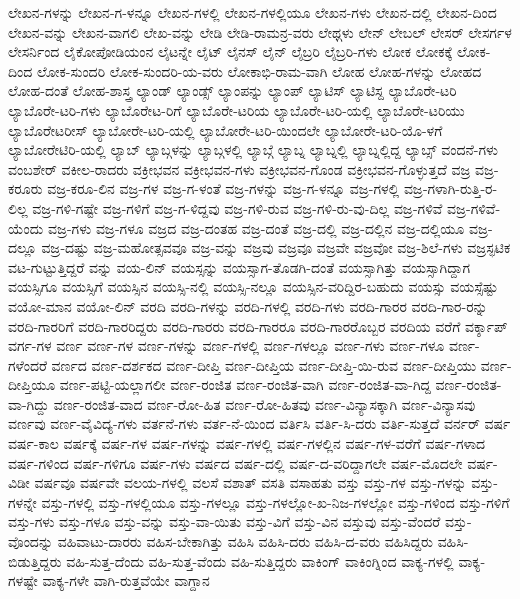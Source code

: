 {ಲೇಖನ-ಗಳನ್ನು
ಲೇಖನ-ಗ-ಳನ್ನೂ
ಲೇಖನ-ಗಳಲ್ಲಿ
ಲೇಖನ-ಗಳಲ್ಲಿಯೂ
ಲೇಖನ-ಗಳು
ಲೇಖನ-ದಲ್ಲಿ
ಲೇಖನ-ದಿಂದ
ಲೇಖನ-ವನ್ನು
ಲೇಖನ-ವಾಗಲಿ
ಲೇಖ-ವನ್ನು
ಲೇಡಿ
ಲೇಡಿ-ರಾಮನ್ರ-ವರು
ಲೇಥ್ಗಳು
ಲೇನ್
ಲೇಬಲ್
ಲೇಸರ್
ಲೇಸರ್ಗಳ
ಲೇಸರ್ನಿಂದ
ಲೈಕೋಪೋಡಿಯಂನ
ಲೈಟನ್ನೇ
ಲೈಟ್
ಲೈನಸ್
ಲೈನ್
ಲೈಬ್ರರಿ
ಲೈಬ್ರರಿ-ಗಳು
ಲೋಕ
ಲೋಕಕ್ಕೆ
ಲೋಕ-ದಿಂದ
ಲೋಕ-ಸುಂದರಿ
ಲೋಕ-ಸುಂದರಿ-ಯ-ವರು
ಲೋಕಾಭಿ-ರಾಮ-ವಾಗಿ
ಲೋಹ
ಲೋಹ-ಗಳನ್ನು
ಲೋಹದ
ಲೋಹ-ದಂತೆ
ಲೋಹ-ಶಾಸ್ತ್ರ
ಲ್ಯಾಂಡ್
ಲ್ಯಾಂಡ್ಸ್
ಲ್ಯಾಂಪನ್ನು
ಲ್ಯಾಂಪ್
ಲ್ಯಾಟಿಸ್
ಲ್ಯಾಟಿಸ್ದ
ಲ್ಯಾಬೊರೇ-ಟರಿ
ಲ್ಯಾಬೊರೇ-ಟರಿ-ಗಳು
ಲ್ಯಾಬೊರೇಟ-ರಿಗೆ
ಲ್ಯಾಬೊರೇ-ಟರಿಯ
ಲ್ಯಾಬೊರೇ-ಟರಿ-ಯಲ್ಲಿ
ಲ್ಯಾಬೊರೇ-ಟರಿಯು
ಲ್ಯಾಬೊರೇಟರೀಸ್
ಲ್ಯಾಬೋರೇ-ಟರಿ-ಯಲ್ಲಿ
ಲ್ಯಾಬೋರೇ-ಟರಿ-ಯಿಂದಲೇ
ಲ್ಯಾಬೋರೇ-ಟರಿ-ಯೊ-ಳಗೆ
ಲ್ಯಾಬೋರೇಟಿರಿ-ಯಲ್ಲಿ
ಲ್ಯಾಬ್
ಲ್ಯಾಬ್ಗಳನ್ನು
ಲ್ಯಾಬ್ಗಳಲ್ಲಿ
ಲ್ಯಾಬ್ಗೆ
ಲ್ಯಾಬ್ನ
ಲ್ಯಾಬ್ನಲ್ಲಿ
ಲ್ಯಾಬ್ನಲ್ಲಿದ್ದ
ಲ್ಯಾಬ್ಸ್
ವಂದನೆ-ಗಳು
ವಂಬಶೇರ್
ವಕೀಲ-ರಾದರು
ವಕ್ರೀಭವನ
ವಕ್ರೀಭವನ-ಗಳು
ವಕ್ರೀಭವನ-ಗೊಂಡ
ವಕ್ರೀಭವನ-ಗೊಳ್ಳುತ್ತದೆ
ವಜ್ರ
ವಜ್ರ-ಕರೂರು
ವಜ್ರ-ಕರೂ-ಲಿನ
ವಜ್ರ-ಗಳ
ವಜ್ರ-ಗ-ಳಂತೆ
ವಜ್ರ-ಗಳನ್ನು
ವಜ್ರ-ಗ-ಳನ್ನೂ
ವಜ್ರ-ಗಳಲ್ಲಿ
ವಜ್ರ-ಗಳಾಗಿ-ರುತ್ತಿ-ರ-ಲಿಲ್ಲ
ವಜ್ರ-ಗಳಿ-ಗಷ್ಟೇ
ವಜ್ರ-ಗಳಿಗೆ
ವಜ್ರ-ಗ-ಳಿದ್ದವು
ವಜ್ರ-ಗಳಿ-ರುವ
ವಜ್ರ-ಗಳಿ-ರು-ವು-ದಿಲ್ಲ
ವಜ್ರ-ಗಳಿವೆ
ವಜ್ರ-ಗಳಿವೆ-ಯೆಂದು
ವಜ್ರ-ಗಳು
ವಜ್ರ-ಗಳೂ
ವಜ್ರದ
ವಜ್ರ-ದಂತಹ
ವಜ್ರ-ದಂತೆ
ವಜ್ರ-ದಲ್ಲಿ
ವಜ್ರ-ದಲ್ಲಿನ
ವಜ್ರ-ದಲ್ಲಿಯೂ
ವಜ್ರ-ದಲ್ಲೂ
ವಜ್ರ-ದಷ್ಟು
ವಜ್ರ-ಮಹೋತ್ಸವವೂ
ವಜ್ರ-ವನ್ನು
ವಜ್ರವು
ವಜ್ರವೂ
ವಜ್ರವೇ
ವಜ್ರವೋ
ವಜ್ರ-ಶಿಲೆ-ಗಳು
ವಜ್ರಸ್ಫಟಿಕ
ವಟ-ಗುಟ್ಟುತ್ತಿದ್ದರೆ
ವನ್ನು
ವಯ-ಲಿನ್
ವಯಸ್ಸನ್ನು
ವಯಸ್ಸಾಗ-ತೊಡಗಿ-ದಂತೆ
ವಯಸ್ಸಾಗಿತ್ತು
ವಯಸ್ಸಾಗಿದ್ದಾಗ
ವಯಸ್ಸಿಗೂ
ವಯಸ್ಸಿಗೆ
ವಯಸ್ಸಿನ
ವಯಸ್ಸಿ-ನಲ್ಲಿ
ವಯಸ್ಸಿ-ನಲ್ಲೂ
ವಯಸ್ಸಿನ-ವರಿದ್ದಿರ-ಬಹುದು
ವಯಸ್ಸು
ವಯಸ್ಸೆಷ್ಟು
ವಯೋ-ಮಾನ
ವಯೋ-ಲಿನ್
ವರದಿ
ವರದಿ-ಗಳನ್ನು
ವರದಿ-ಗಳಲ್ಲಿ
ವರದಿ-ಗಳು
ವರದಿ-ಗಾರರ
ವರದಿ-ಗಾರ-ರನ್ನು
ವರದಿ-ಗಾರರಿಗೆ
ವರದಿ-ಗಾರರಿದ್ದರು
ವರದಿ-ಗಾರರು
ವರದಿ-ಗಾರರೂ
ವರದಿ-ಗಾರರೊಬ್ಬರ
ವರದಿಯ
ವರೆಗೆ
ವರ್ಕ್ಶಾಪ್
ವರ್ಗ-ಗಳ
ವರ್ಣ
ವರ್ಣ-ಗಳ
ವರ್ಣ-ಗಳನ್ನು
ವರ್ಣ-ಗಳಲ್ಲಿ
ವರ್ಣ-ಗಳಲ್ಲೂ
ವರ್ಣ-ಗಳು
ವರ್ಣ-ಗಳೂ
ವರ್ಣ-ಗಳೆಂದರೆ
ವರ್ಣದ
ವರ್ಣ-ದರ್ಶಕದ
ವರ್ಣ-ದೀಪ್ತಿ
ವರ್ಣ-ದೀಪ್ತಿಯ
ವರ್ಣ-ದೀಪ್ತಿ-ಯಿ-ರುವ
ವರ್ಣ-ದೀಪ್ತಿಯು
ವರ್ಣ-ದೀಪ್ತಿಯೂ
ವರ್ಣ-ಪಟ್ಟಿ-ಯಲ್ಲಾಗಲೀ
ವರ್ಣ-ರಂಜಿತ
ವರ್ಣ-ರಂಜಿತ-ವಾಗಿ
ವರ್ಣ-ರಂಜಿತ-ವಾ-ಗಿದ್ದ
ವರ್ಣ-ರಂಜಿತ-ವಾ-ಗಿದ್ದು
ವರ್ಣ-ರಂಜಿತ-ವಾದ
ವರ್ಣ-ರೋ-ಹಿತ
ವರ್ಣ-ರೋ-ಹಿತವು
ವರ್ಣ-ವಿನ್ಯಾಸಕ್ಕಾಗಿ
ವರ್ಣ-ವಿನ್ಯಾಸವು
ವರ್ಣವು
ವರ್ಣ-ವೈವಿದ್ಯ-ಗಳು
ವರ್ತನೆ-ಗಳು
ವರ್ತ-ನೆ-ಯಿಂದ
ವರ್ತಿಸಿ
ವರ್ತಿ-ಸಿ-ದರು
ವರ್ತಿ-ಸುತ್ತದೆ
ವರ್ನರ್
ವರ್ಷ
ವರ್ಷ-ಕಾಲ
ವರ್ಷಕ್ಕೆ
ವರ್ಷ-ಗಳ
ವರ್ಷ-ಗಳನ್ನು
ವರ್ಷ-ಗಳಲ್ಲಿ
ವರ್ಷ-ಗಳಲ್ಲಿನ
ವರ್ಷ-ಗಳ-ವರೆಗೆ
ವರ್ಷ-ಗಳಾದ
ವರ್ಷ-ಗಳಿಂದ
ವರ್ಷ-ಗಳಿಗೂ
ವರ್ಷ-ಗಳು
ವರ್ಷದ
ವರ್ಷ-ದಲ್ಲಿ
ವರ್ಷ-ದ-ವರಿದ್ದಾಗಲೇ
ವರ್ಷ-ಮೊದಲೇ
ವರ್ಷ-ವಿಡೀ
ವರ್ಷವೂ
ವರ್ಷವೇ
ವಲಯ-ಗಳಲ್ಲಿ
ವಲಸೆ
ವಶಾತ್
ವಸತಿ
ವಸಾಹತು
ವಸ್ತು
ವಸ್ತು-ಗಳ
ವಸ್ತು-ಗಳನ್ನು
ವಸ್ತು-ಗಳನ್ನೇ
ವಸ್ತು-ಗಳಲ್ಲಿ
ವಸ್ತು-ಗಳಲ್ಲಿಯೂ
ವಸ್ತು-ಗಳಲ್ಲೂ
ವಸ್ತು-ಗಳಲ್ಲೋ-ಖ-ನಿಜ-ಗಳಲ್ಲೋ
ವಸ್ತು-ಗಳಿಂದ
ವಸ್ತು-ಗಳಿಗೆ
ವಸ್ತು-ಗಳು
ವಸ್ತು-ಗಳೂ
ವಸ್ತು-ವನ್ನು
ವಸ್ತು-ವಾ-ಯಿತು
ವಸ್ತು-ವಿಗೆ
ವಸ್ತು-ವಿನ
ವಸ್ತುವು
ವಸ್ತು-ವೆಂದರೆ
ವಸ್ತು-ವೊಂದನ್ನು
ವಹಿವಾಟು-ದಾರರು
ವಹಿಸ-ಬೇಕಾಗಿತ್ತು
ವಹಿಸಿ
ವಹಿಸಿ-ದರು
ವಹಿಸಿ-ದ-ವರು
ವಹಿಸಿದ್ದರು
ವಹಿಸಿ-ಬಿಡುತ್ತಿದ್ದರು
ವಹಿ-ಸುತ್ತ-ದೆಂದು
ವಹಿ-ಸುತ್ತ-ವೆಂದು
ವಹಿ-ಸುತ್ತಿದ್ದರು
ವಾಕಿಂಗ್
ವಾಕಿಂಗ್ನಿಂದ
ವಾಕ್ಯ-ಗಳಲ್ಲಿ
ವಾಕ್ಯ-ಗಳಷ್ಟೇ
ವಾಕ್ಯ-ಗಳೇ
ವಾಗಿ-ರುತ್ತವೆಯೇ
ವಾಗ್ದಾನ
}
